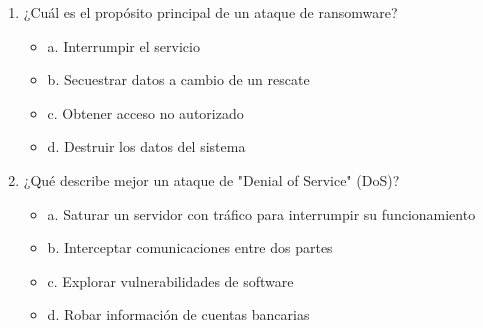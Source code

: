 \documentclass[a4paper]{article}
\begin{document}
\begin{enumerate}
    \item ¿Cuál es el propósito principal de un ataque de ransomware?
    \begin{itemize}
        \item a. Interrumpir el servicio
        \item b. Secuestrar datos a cambio de un rescate
        \item c. Obtener acceso no autorizado
        \item d. Destruir los datos del sistema
    \end{itemize}

    \item ¿Qué describe mejor un ataque de "Denial of Service" (DoS)?
    \begin{itemize}
        \item a. Saturar un servidor con tráfico para interrumpir su funcionamiento
        \item b. Interceptar comunicaciones entre dos partes
        \item c. Explorar vulnerabilidades de software
        \item d. Robar información de cuentas bancarias
    \end{itemize}



\end{enumerate}
\end{document}
